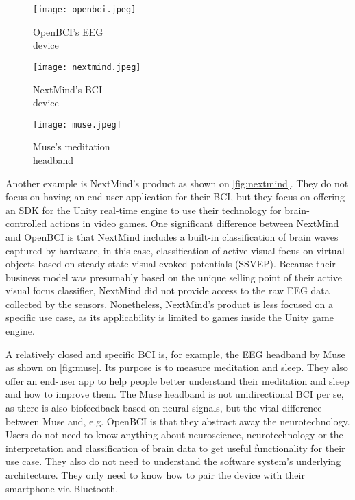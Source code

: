 \begin{figure}[!ht]
  \texttt{[image: openbci.jpeg]}
  \caption{OpenBCI's EEG \\ device \citep{be_superhvman_conor_2017}}
  \label{fig:openbci}
  \endminipage\hfill
  \texttt{[image: nextmind.jpeg]}
  \caption{NextMind's BCI \\ device \citep{louise_neurotechnology_2019}}
  \label{fig:nextmind}
  \endminipage\hfill
  \texttt{[image: muse.jpeg]}
  \caption{Muse's meditation \\ headband \citep{muse_muse_nodate}}
  \label{fig:muse}
  \endminipage
\end{figure}

Another example is NextMind's product as shown on \autoref{fig:nextmind}. They do not focus on having an end-user application for their BCI, but they focus on offering an SDK for the Unity real-time engine to use their technology for brain-controlled actions in video games. One significant difference between NextMind and OpenBCI is that NextMind includes a built-in classification of brain waves captured by hardware, in this case, classification of active visual focus on virtual objects based on steady-state visual evoked potentials (SSVEP). Because their business model was presumably based on the unique selling point of their active visual focus classifier, NextMind did not provide access to the raw EEG data collected by the sensors. Nonetheless, NextMind's product is less focused on a specific use case, as its applicability is limited to games inside the Unity game engine.

A relatively closed and specific BCI is, for example, the EEG headband by Muse as shown on \autoref{fig:muse}. Its purpose is to measure meditation and sleep. They also offer an end-user app to help people better understand their meditation and sleep and how to improve them. The Muse headband is not unidirectional BCI per se, as there is also biofeedback based on neural signals, but the vital difference between Muse and, e.g. OpenBCI is that they abstract away the neurotechnology. Users do not need to know anything about neuroscience, neurotechnology or the interpretation and classification of brain data to get useful functionality for their use case. They also do not need to understand the software system's underlying architecture. They only need to know how to pair the device with their smartphone via Bluetooth.

